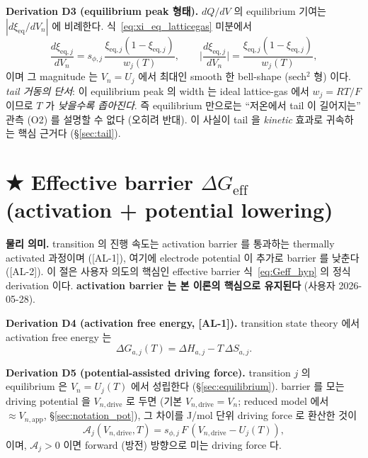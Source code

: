 \documentclass[11pt,a4paper]{article}
\newcommand{\eff}{\mathrm{eff}}
\newcommand{\eq}{\mathrm{eq}}
\newcommand{\app}{\mathrm{app}}
\newcommand{\dimedrive}{\mathrm{drive}}
\newcommand{\AL}[1]{\textsf{[AL-#1]}}
\begin{document}
\textbf{Derivation D3 (equilibrium peak 형태).} $dQ/dV$ 의 equilibrium 기여는
$|d\xi_\eq/dV_n|$ 에 비례한다. 식~\eqref{eq:xi_eq_latticegas} 미분에서
\begin{equation}
\frac{d\xi_{\eq,j}}{dV_n} = s_{\phi,j}\,\frac{\xi_{\eq,j}(1-\xi_{\eq,j})}{w_j(T)},
\qquad
\Big|\frac{d\xi_{\eq,j}}{dV_n}\Big| = \frac{\xi_{\eq,j}(1-\xi_{\eq,j})}{w_j(T)},
\label{eq:dxi_eq}
\end{equation}
이며 그 magnitude 는 $V_n=U_j$ 에서 최대인 smooth 한 bell-shape (sech$^2$ 형) 이다. \emph{tail
거동의 단서}: 이 equilibrium peak 의 width 는 ideal lattice-gas 에서 $w_j=RT/F$ 이므로
$T$ 가 \emph{낮을수록 좁아진다}. 즉 equilibrium 만으로는 ``저온에서 tail 이 길어지는''
관측 (O2) 를 설명할 수 없다 (오히려 반대). 이 사실이 tail 을 \emph{kinetic} 효과로
귀속하는 핵심 근거다 (\S\ref{sec:tail}).

\section{★ Effective barrier $\Delta G_\eff$ (activation + potential lowering)}\label{sec:barrier}
\textbf{물리 의미.} transition 의 진행 속도는 activation barrier 를 통과하는
thermally activated 과정이며 (\AL{1}), 여기에 electrode potential 이 추가로 barrier 를
낮춘다 (\AL{2}). 이 절은 사용자 의도의 핵심인 effective barrier
식~\eqref{eq:Geff_hyp} 의 정식 derivation 이다. \textbf{activation barrier 는 본
이론의 핵심으로 유지된다} (사용자 2026-05-28).

\textbf{Derivation D4 (activation free energy, \AL{1}).} transition state theory
\cite{eyring1935,evanspolanyi1935} 에서 activation free energy 는
\begin{equation}
\Delta G_{a,j}(T) = \Delta H_{a,j} - T\,\Delta S_{a,j}.
\label{eq:Ga}
\end{equation}

\textbf{Derivation D5 (potential-assisted driving force).} transition $j$ 의
equilibrium 은 $V_n=U_j(T)$ 에서 성립한다 (\S\ref{sec:equilibrium}). barrier 를 모는
driving potential 을 $V_{n,\dimedrive}$ 로 두면 (기본 $V_{n,\dimedrive}=V_n$; reduced
model 에서 $\approx V_{n,\app}$, \S\ref{sec:notation_pot}), 그 차이를 J/mol 단위 driving
force 로 환산한 것이
\begin{equation}
\mathcal A_j(V_{n,\dimedrive},T) = s_{\phi,j}\,F\,(V_{n,\dimedrive}-U_j(T)),
\label{eq:Aj}
\end{equation}
이며, $\mathcal A_j>0$ 이면 forward (방전) 방향으로 미는 driving force 다.
\end{document}
